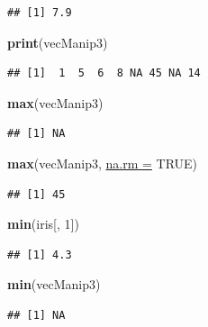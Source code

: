 \documentclass[twoside,symmetric]{book}
\newenvironment{Shaded}{}{}
\newcommand{\DataTypeTok}[1]{\underline{#1}}
\newcommand{\DecValTok}[1]{#1}
\newcommand{\KeywordTok}[1]{\textbf{#1}}
\newcommand{\NormalTok}[1]{#1}
\newcommand{\OtherTok}[1]{#1}
\begin{document}
\begin{verbatim}
## [1] 7.9
\end{verbatim}

\begin{Shaded}
\begin{Highlighting}[]
\KeywordTok{print}\NormalTok{(vecManip3)}
\end{Highlighting}
\end{Shaded}

\begin{verbatim}
## [1]  1  5  6  8 NA 45 NA 14
\end{verbatim}

\begin{Shaded}
\begin{Highlighting}[]
\KeywordTok{max}\NormalTok{(vecManip3)}
\end{Highlighting}
\end{Shaded}

\begin{verbatim}
## [1] NA
\end{verbatim}

\begin{Shaded}
\begin{Highlighting}[]
\KeywordTok{max}\NormalTok{(vecManip3, }\DataTypeTok{na.rm =} \OtherTok{TRUE}\NormalTok{)}
\end{Highlighting}
\end{Shaded}

\begin{verbatim}
## [1] 45
\end{verbatim}

\begin{Shaded}
\begin{Highlighting}[]
\KeywordTok{min}\NormalTok{(iris[, }\DecValTok{1}\NormalTok{])}
\end{Highlighting}
\end{Shaded}

\begin{verbatim}
## [1] 4.3
\end{verbatim}

\begin{Shaded}
\begin{Highlighting}[]
\KeywordTok{min}\NormalTok{(vecManip3)}
\end{Highlighting}
\end{Shaded}

\begin{verbatim}
## [1] NA
\end{verbatim}
\end{document}
